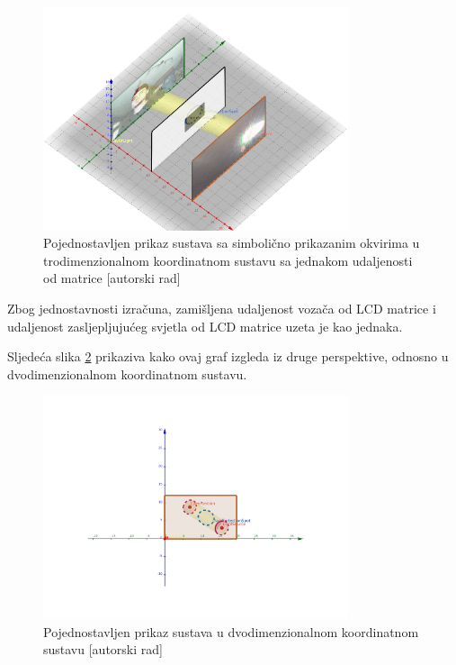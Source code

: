 \documentclass{foi}
\begin{document}
\begin{figure}[h!]
    \centering
    \includegraphics[width=0.8\textwidth]{slike/sustav6}
    \caption{Pojednostavljen prikaz sustava sa simbolično prikazanim okvirima u trodimenzionalnom koordinatnom sustavu sa jednakom udaljenosti od matrice [autorski rad]}
    \label{fig:sustav6}
\end{figure}

Zbog jednostavnosti izračuna, zamišljena udaljenost vozača od LCD matrice i udaljenost zasljepljujućeg svjetla od LCD matrice uzeta je kao jednaka.

Sljedeća slika \ref{fig:sustav4} prikaziva kako ovaj graf izgleda iz druge perspektive, odnosno u dvodimenzionalnom koordinatnom sustavu.

\begin{figure}[h!]
    \centering
    \includegraphics[width=0.8\textwidth]{slike/sustav4}
    \caption{Pojednostavljen prikaz sustava u dvodimenzionalnom koordinatnom sustavu [autorski rad]}
    \label{fig:sustav4}
\end{figure}
\end{document}
